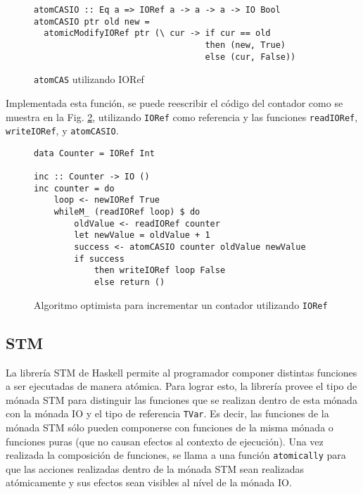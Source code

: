 \begin{figure}[H]
\begin{verbatim}
atomCASIO :: Eq a => IORef a -> a -> a -> IO Bool
atomCASIO ptr old new =
  atomicModifyIORef ptr (\ cur -> if cur == old
                                  then (new, True)
                                  else (cur, False))
\end{verbatim}
\caption{\texttt{atomCAS} utilizando IORef}
\label{fig:atomcasio}
\end{figure}

Implementada esta función, se puede reescribir el código del contador como se muestra en la Fig. \ref{fig:lockfree-counter-example-ioref}, utilizando \texttt{IORef} como referencia y las funciones \texttt{readIORef}, \texttt{writeIORef}, y \texttt{atomCASIO}.

\begin{figure}[H]
\begin{verbatim}
data Counter = IORef Int

inc :: Counter -> IO ()
inc counter = do
    loop <- newIORef True
    whileM_ (readIORef loop) $ do
        oldValue <- readIORef counter
        let newValue = oldValue + 1
        success <- atomCASIO counter oldValue newValue
        if success
            then writeIORef loop False
            else return ()
\end{verbatim}
\caption{Algoritmo optimista para incrementar un contador utilizando \texttt{IORef}}
\label{fig:lockfree-counter-example-ioref}
\end{figure}

\subsection{STM}\label{sub:stm}
La librería STM de Haskell permite al programador componer distintas funciones a ser ejecutadas de manera atómica.
Para lograr esto, la librería provee el tipo de mónada STM para distinguir las funciones que se realizan dentro de esta mónada con la mónada IO y el tipo de referencia \texttt{TVar}.
Es decir, las funciones de la mónada STM sólo pueden componerse con funciones de la misma mónada o funciones puras (que no causan efectos al contexto de ejecución). Una vez realizada la composición de funciones, se llama a una función \texttt{atomically} para que las acciones realizadas dentro de la mónada STM sean realizadas atómicamente y sus efectos sean visibles al nível de la mónada IO.

